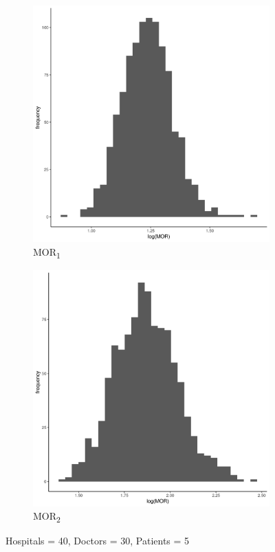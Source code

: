 \documentclass[
  letterpaper,
  DIV=11,
  numbers=noendperiod,
  titlepage]{scrartcl}
\begin{document}
\vspace{10mm}

\begin{figure}
\centering
\begin{subfigure}{.49\textwidth}
    \centering
    \includegraphics[width=.95\linewidth]{../../plots/three-lvl-ran-int/low-prev/hist_40_30_5_three_lvl_low_prev_mor1.png}  
    \caption{MOR\textsubscript{1}}
    \label{l40m30n51}
\end{subfigure}
\begin{subfigure}{.49\textwidth}
    \centering
    \includegraphics[width=.95\linewidth]{../../plots/three-lvl-ran-int/low-prev/hist_40_30_5_three_lvl_low_prev_mor2.png}
    \caption{MOR\textsubscript{2}}
    \label{l40m30n52}
\end{subfigure}
\caption{Hospitals = 40, Doctors = 30, Patients = 5}
\label{mor2}
\end{figure}
\end{document}
